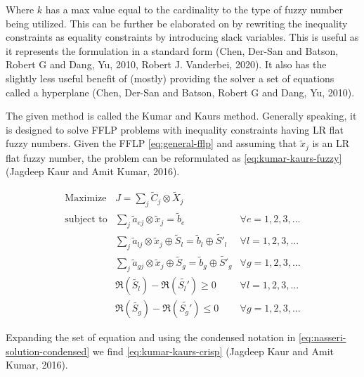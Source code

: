 \documentclass[11pt,a4paper,final]{article}
\begin{document}
Where \(k\) has a max value equal to the cardinality to the type of fuzzy number being utilized. This can be further be
elaborated on by rewriting the inequality constraints as equality constraints by introducing slack variables. This is
useful as it represents the formulation in a standard form (Chen, Der-San and Batson, Robert G and Dang, Yu, 2010, Robert J. Vanderbei, 2020). It
also has the slightly less useful benefit of (mostly) providing the solver a set of equations called a hyperplane
(Chen, Der-San and Batson, Robert G and Dang, Yu, 2010).

The given method is called the Kumar and Kaurs method. Generally speaking, it is designed to solve FFLP problems with
inequality constraints having LR flat fuzzy numbers. Given the FFLP \ref{eq:general-fflp} and assuming that
\(\tilde{x}_j\) is an LR flat fuzzy number, the problem can be reformulated as \ref{eq:kumar-kaurs-fuzzy}
(Jagdeep Kaur and Amit Kumar, 2016).

\begin{equation}
\label{eq:kumar-kaurs-fuzzy}
\begin{array}{lll}
\text{Maximize}   & J = \sum_j \tilde{C}_j \otimes \tilde{X}_j              &                                              \\
\text{subject to} & \sum_j \tilde{a}_{ej} \otimes \tilde{x}_j               = \tilde{b}_e & \forall e = 1,2,3,...                \\
                  & \sum_j \tilde{a}_{lj} \otimes \tilde{x}_j \oplus \tilde{S}_l = \tilde{b}_l \oplus \tilde{S'}_l & \forall l = 1,2,3,... \\
                  & \sum_j \tilde{a}_{gj} \otimes \tilde{x}_j \oplus \tilde{S}_g = \tilde{b}_g \oplus \tilde{S'}_g & \forall g = 1,2,3,... \\
                  & \mathfrak{R}(\tilde{S_l}) - \mathfrak{R}(\tilde{S_l'}) \ge 0                                     & \forall l = 1,2,3,...      \\
                  & \mathfrak{R}(\tilde{S_g}) - \mathfrak{R}(\tilde{S_g'}) \le 0                                     & \forall g = 1,2,3,...
\end{array}
\end{equation}

Expanding the set of equation and using the condensed notation in \ref{eq:nasseri-solution-condensed} we find
\ref{eq:kumar-kaurs-crisp} (Jagdeep Kaur and Amit Kumar, 2016).
\end{document}
